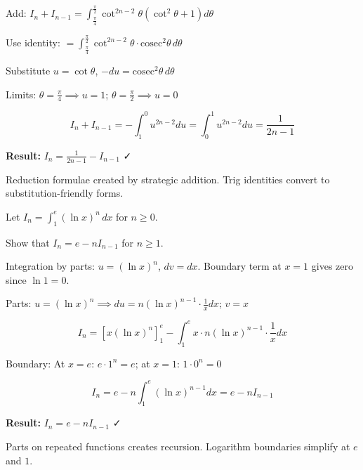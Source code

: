 \begin{solution}
Add: $I_n + I_{n-1} = \int_{\frac{\pi}{4}}^{\frac{\pi}{2}} \cot^{2n-2}\theta(\cot^2\theta + 1) d\theta$

Use identity: $= \int_{\frac{\pi}{4}}^{\frac{\pi}{2}} \cot^{2n-2}\theta \cdot \text{cosec}^2\theta \, d\theta$

Substitute $u = \cot\theta$, $-du = \text{cosec}^2\theta \, d\theta$

Limits: $\theta=\frac{\pi}{4} \implies u=1$; $\theta=\frac{\pi}{2} \implies u=0$

\[
I_n + I_{n-1} = -\int_1^0 u^{2n-2} du = \int_0^1 u^{2n-2} du = \frac{1}{2n-1}
\]

\textbf{Result:} $\boxed{I_n = \frac{1}{2n-1} - I_{n-1}}$ ✓
\end{solution}

\begin{takeaways}
Reduction formulae created by strategic addition. Trig identities convert to substitution-friendly forms.
\end{takeaways}

\vspace{1cm}

\begin{problem}
Let $I_n = \int_1^e (\ln x)^n \, dx$ for $n \ge 0$.

Show that $I_n = e - nI_{n-1}$ for $n \ge 1$.
\end{problem}

\begin{hint}
Integration by parts: $u = (\ln x)^n$, $dv = dx$. Boundary term at $x=1$ gives zero since $\ln 1 = 0$.
\end{hint}

\begin{solution}
Parts: $u = (\ln x)^n \implies du = n(\ln x)^{n-1} \cdot \frac{1}{x}dx$; $v = x$

\[
I_n = [x(\ln x)^n]_1^e - \int_1^e x \cdot n(\ln x)^{n-1} \cdot \frac{1}{x} dx
\]

Boundary: At $x=e$: $e \cdot 1^n = e$; at $x=1$: $1 \cdot 0^n = 0$

\[
I_n = e - n\int_1^e (\ln x)^{n-1} dx = e - nI_{n-1}
\]

\textbf{Result:} $\boxed{I_n = e - nI_{n-1}}$ ✓
\end{solution}

\begin{takeaways}
Parts on repeated functions creates recursion. Logarithm boundaries simplify at $e$ and $1$.
\end{takeaways}

